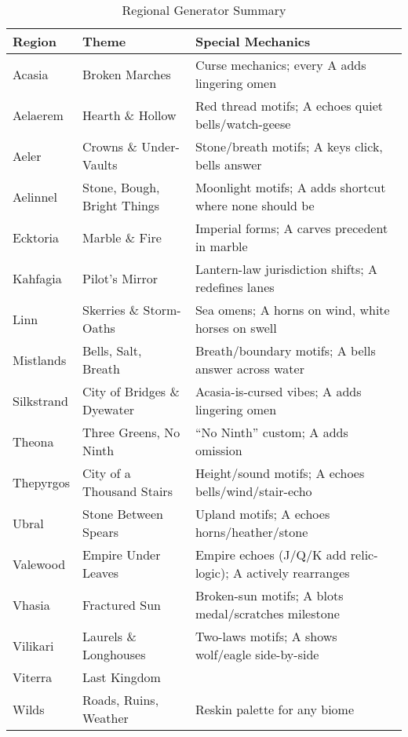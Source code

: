 \begin{table}[htbp]
\centering
\begin{tabular}{lll}
\toprule
\textbf{Region} & \textbf{Theme} & \textbf{Special Mechanics} \\
\midrule
Acasia & Broken Marches & Curse mechanics; every A adds lingering omen \\
Aelaerem & Hearth \& Hollow & Red thread motifs; A echoes quiet bells/watch-geese \\
Aeler & Crowns \& Under-Vaults & Stone/breath motifs; A keys click, bells answer \\
Aelinnel & Stone, Bough, Bright Things & Moonlight motifs; A adds shortcut where none should be \\
Ecktoria & Marble \& Fire & Imperial forms; A carves precedent in marble \\
Kahfagia & Pilot's Mirror & Lantern-law jurisdiction shifts; A redefines lanes \\
Linn & Skerries \& Storm-Oaths & Sea omens; A horns on wind, white horses on swell \\
Mistlands & Bells, Salt, Breath & Breath/boundary motifs; A bells answer across water \\
Silkstrand & City of Bridges \& Dyewater & Acasia-is-cursed vibes; A adds lingering omen \\
Theona & Three Greens, No Ninth & ``No Ninth'' custom; A adds omission \\
Thepyrgos & City of a Thousand Stairs & Height/sound motifs; A echoes bells/wind/stair-echo \\
Ubral & Stone Between Spears & Upland motifs; A echoes horns/heather/stone \\
Valewood & Empire Under Leaves & Empire echoes (J/Q/K add relic-logic); A actively rearranges \\
Vhasia & Fractured Sun & Broken-sun motifs; A blots medal/scratches milestone \\
Vilikari & Laurels \& Longhouses & Two-laws motifs; A shows wolf/eagle side-by-side \\
Viterra & Last Kingdom & & \\
Wilds & Roads, Ruins, Weather & Reskin palette for any biome \\
\bottomrule
\end{tabular}
\caption{Regional Generator Summary}
\end{table}




















